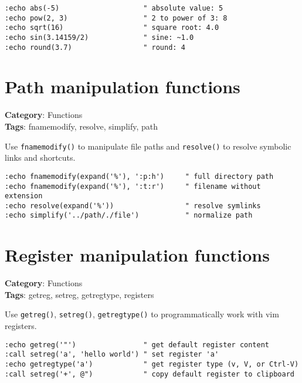 \begin{Exa*}{}
\begin{Verbatim}[fontsize=\footnotesize, breaklines, breakanywhere]
:echo abs(-5)                    " absolute value: 5
:echo pow(2, 3)                  " 2 to power of 3: 8
:echo sqrt(16)                   " square root: 4.0
:echo sin(3.14159/2)             " sine: ~1.0
:echo round(3.7)                 " round: 4
\end{Verbatim}
\end{Exa*}

\section{Path manipulation functions}

\textbf{Category}: Functions\\ \textbf{Tags}: fnamemodify, resolve, simplify, path
\vspace{0.5cm}

Use {\footnotesize \Verb§fnamemodify()§} to manipulate file paths and {\footnotesize \Verb§resolve()§} to resolve symbolic links and shortcuts.

\begin{Exa*}{}
\begin{Verbatim}[fontsize=\footnotesize, breaklines, breakanywhere]
:echo fnamemodify(expand('%'), ':p:h')     " full directory path
:echo fnamemodify(expand('%'), ':t:r')     " filename without extension
:echo resolve(expand('%'))                 " resolve symlinks
:echo simplify('../path/./file')           " normalize path
\end{Verbatim}
\end{Exa*}

\section{Register manipulation functions}

\textbf{Category}: Functions\\ \textbf{Tags}: getreg, setreg, getregtype, registers
\vspace{0.5cm}

Use {\footnotesize \Verb§getreg()§}, {\footnotesize \Verb§setreg()§}, {\footnotesize \Verb§getregtype()§} to programmatically work with vim registers.

\begin{Exa*}{}
\begin{Verbatim}[fontsize=\footnotesize, breaklines, breakanywhere]
:echo getreg('"')                " get default register content
:call setreg('a', 'hello world') " set register 'a'
:echo getregtype('a')            " get register type (v, V, or Ctrl-V)
:call setreg('+', @")            " copy default register to clipboard
\end{Verbatim}
\end{Exa*}

